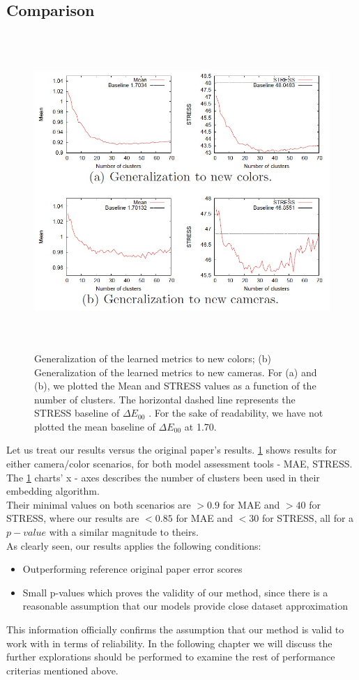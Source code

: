%
\\



\subsection{Comparison}

\begin{figure}[h] \label{original paper results}
			\includegraphics[width=\linewidth,height=12cm,keepaspectratio]{Figures/original_paper_results}
			\caption[orig res]
			{Generalization of the learned metrics to new colors; (b) Generalization of
			the learned metrics to new cameras. For (a) and (b), we plotted the Mean and STRESS
			values as a function of the number of clusters. The horizontal dashed line represents
			the STRESS baseline of $\Delta E_{00}$ . For the sake of readability, we have not plotted the
			mean baseline of $\Delta E_{00}$ at 1.70.}
\end{figure}


Let us treat our results versus the original paper's results.
\ref{original paper results} shows results for either camera/color scenarios, for both model assessment tools - MAE, STRESS. \\
The \ref{original paper results} charts' x - axes describes the number of clusters been used in their embedding algorithm. \\
Their minimal values on both scenarios are $> 0.9$ for MAE and $> 40$ for STRESS, where our results are $< 0.85$ for MAE and $< 30$ for STRESS, all for a $p - value$ with a similar magnitude to theirs. \\
As clearly seen, our results applies the following conditions:
\begin{itemize}
\item Outperforming reference original paper error scores
\item Small p-values which proves the validity of our method, since there is a reasonable assumption that our models provide close dataset approximation
\end{itemize}

This information officially confirms the assumption that our method is valid to work with in terms of reliability. In the following chapter we will discuss the further explorations should be performed to examine the rest of performance criterias mentioned above.





